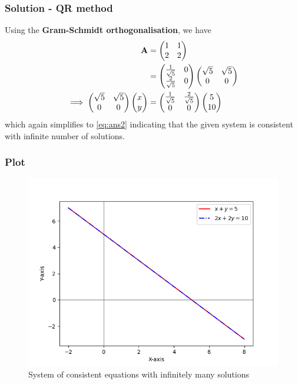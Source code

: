 \documentclass{beamer}
\begin{document}
\begin{frame}
\frametitle{Solution - QR method}
Using the \textbf{Gram-Schmidt orthogonalisation}, we have
\begin{align}
	\mathbf{A} &= \begin{pmatrix}1 & 1 \\ 2 & 2\end{pmatrix} \\
		&= \begin{pmatrix}\frac{1}{\sqrt{5}} & 0 \\ \frac{2}{\sqrt{5}} & 0\end{pmatrix} \begin{pmatrix}\sqrt{5} & \sqrt{5} \\ 0 & 0\end{pmatrix} \\
	\implies \begin{pmatrix}\sqrt{5} & \sqrt{5} \\ 0 & 0\end{pmatrix} \begin{pmatrix}x \\ y\end{pmatrix} &= \begin{pmatrix}\frac{1}{\sqrt{5}} & \frac{2}{\sqrt{5}} \\ 0 & 0\end{pmatrix} \begin{pmatrix}5 \\ 10\end{pmatrix}
\end{align}
which again simplifies to \eqref{eq:ans2} indicating that the given system is consistent with infinite number of solutions.
\end{frame}

\begin{frame}
\frametitle{Plot}
\begin{figure}[h]
\centering
\includegraphics[width=\columnwidth]{figs/fig.png}
\caption{System of consistent equations with infinitely many solutions}
\label{fig:Plot1} 
\end{figure}
\end{frame}
\end{document}
